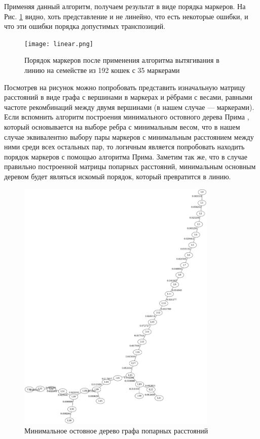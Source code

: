 \documentclass{matmex-diploma-custom}
\begin{document}
Применяя данный алгоритм, получаем результат в виде порядка маркеров.
На Рис. \ref{fig:fig3} видно, хоть представление и не линейно, что
есть некоторые ошибки, и что эти ошибки порядка допустимых
транспозиций.
\begin{figure}[h]
 \centering
  \texttt{[image: linear.png]}
  \caption[width=0.4\textwidth]{Порядок маркеров после применения
    алгоритма вытягивания в линию на семействе из 192 кошек с 35 маркерами}
  \label{fig:fig3}
\end{figure}
Посмотрев на рисунок можно попробовать представить изначальную матрицу
расстояний в виде графа с вершинами в маркерах и рёбрами с весами,
равными частоте рекомбинаций между двумя вершинами (в нашем случае ---
маркерами). Если вспомнить алгоритм построения минимального остовного
дерева Прима \cite{cormen2001introduction}, который основывается на
выборе ребра с минимальным весом, что в нашем случае эквивалентно
выбору пары маркеров с минимальным расстоянием между ними среди всех
остальных пар, то логичным является попробовать находить порядок
маркеров с помощью алгоритма Прима. Заметим так же, что в случае
правильно построенной матрицы попарных расстояний, минимальным
основным деревом будет являться искомый порядок, который превратится в
линию.
\begin{figure}[h]
  \centering
  \includegraphics[width=0.85\textwidth]{prm.png}
  \caption[width=0.4\textwidth]{Минимальное остовное дерево графа
    попарных расстояний}
  \label{fig:fig4}
\end{figure}
\end{document}
